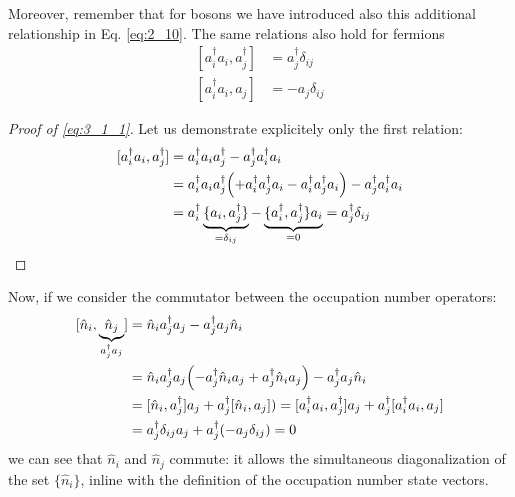 \documentclass[../main/main.tex]{subfiles}
\begin{document}
Moreover, remember that for bosons we have introduced also this additional relationship in Eq. \eqref{eq:2_10}. The same relations also hold for fermions 
\begin{subequations}
\begin{align}
   [a_i^\dag a_i, a_j^\dag] &= a_j^\dag \delta_{ij} \label{eq:3_1_1} \\
   [a_i^\dag a_i, a_j] &= - a_j \delta _{ij}
\end{align}
\end{subequations}
\begin{proof}[Proof of \eqref{eq:3_1_1}]
  Let us demonstrate explicitely only the first relation:
  \begin{equation*}
  \begin{split}
    [a_i^\dag a_i, a_j^\dag] &= a_i^\dag a_i a_j^\dag - a_j^\dag a_i^\dag a_i \\
    & = a_i^\dag a_i a_j ^\dag \qty(+ a_i^\dag a_j ^\dag a_i - a_i ^\dag a_ j ^\dag a_i) - a_j ^\dag a_i ^\dag a_i \\
    & = a_i ^\dag  \underbrace{\{ a_i,a_j ^\dag  \} }_{=\delta _{ij}}   - \underbrace{\{ a_i ^\dag , a_j ^\dag  \} a_i }_{=0} = a_j^\dag \delta _{ij}
  \end{split}
\end{equation*}
\end{proof}
Now, if we consider the commutator between the occupation number operators:
\begin{equation}
\begin{split}
[\hat{n}_i, \underbrace{ \hat{n}_j }_{a_j ^\dag  a_j} ]  &=  \hat{n}_i a_j ^\dag a_j - a_j ^\dag a_j \hat{n}_i   \\
& = \hat{n}_i a_j^\dag a_j \qty( - a_j ^\dag \hat{n}_i a_j + a_j ^\dag \hat{n}_i a_j  ) - a_j ^\dag a_j \hat{n}_i   \\
& = [\hat{n}_i, a_j ^\dag  ]a_j + a_j ^\dag [ \hat{n}_i , a_j ] )
= [a_i ^\dag a_i, a_j ^\dag ]a_j + a_j ^\dag [a_i ^\dag  a_i, a_j] \\
&= a_j ^\dag \delta _{ij} a_j + a_j ^\dag \qty(- a_j \delta _{ij}) = 0
\end{split}
\end{equation}
we can see that \( \hat{n}_i  \) and \( \hat{n}_j  \) commute: it allows the simultaneous diagonalization of the set \( \{ \hat{n}_i  \}   \), inline with the definition of the occupation number state vectors.
\end{document}
